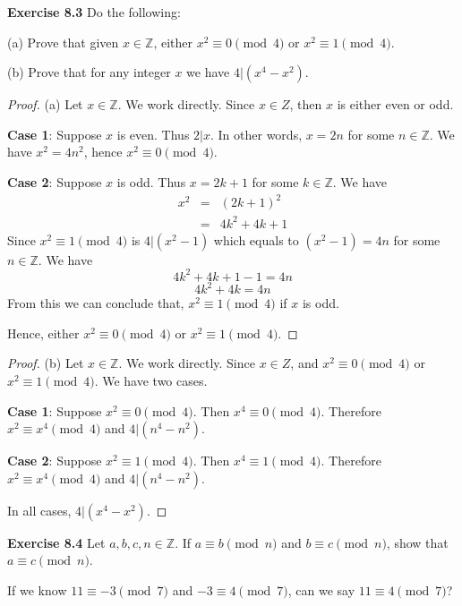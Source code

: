 \documentclass[12pt,oneside]{article}
\newenvironment{exercise}[1]{\vspace{.1in}\noindent\textbf{Exercise #1 \hspace{.05em}}}{}
\newcommand{\Z}{\mathbb{Z}}
\renewcommand{\mod}[3]{#1 \equiv #2 \pmod{#3}}
\begin{document}
\newpage


\begin{exercise}{8.3}
Do the following:

(a) Prove that given $x \in \Z$, either $\mod{x^2}{0}{4}$ or $\mod{x^2}{1}{4}$.

(b) Prove that for any integer $x$ we have $4|(x^4-x^2)$.
\end{exercise}

\begin{proof} {(a)}
Let $x \in \Z$. We work directly. Since $x \in Z$, then $x$ is either even or odd.

\textbf{Case 1}: Suppose $x$ is even. Thus $2|x$. In other words, $x = 2n$ for some $n \in \Z$. We have $x^2 = 4n^2$, hence $\mod{x^2}{0}{4}$.

\textbf{Case 2}: Suppose $x$ is odd. Thus $x = 2k + 1$ for some $k \in \Z$. We have
\begin{eqnarray*}
x^2 &=& (2k + 1)^2\\
&=& 4k^2 + 4k + 1
\end{eqnarray*}
Since $\mod{x^2}{1}{4}$ is $4|(x^2 - 1)$ which equals to $(x^2 - 1) = 4n$ for some $n \in \Z$. We have
\[4k^2 + 4k + 1 - 1 = 4n\]
\[4k^2 + 4k = 4n\]
From this we can conclude that, $\mod{x^2}{1}{4}$ if $x$ is odd.

Hence, either $\mod{x^2}{0}{4}$ or $\mod{x^2}{1}{4}$.
\end{proof}


\begin{proof} {(b)}
Let $x \in \Z$. We work directly. Since $x \in Z$, and $\mod{x^2}{0}{4}$ or $\mod{x^2}{1}{4}$. We have two cases.

\textbf{Case 1}: Suppose $\mod{x^2}{0}{4}$. Then $\mod{x^4}{0}{4}$. Therefore $\mod{x^2}{x^4}{4}$ and $4|(n^4 - n^2)$.

\textbf{Case 2}: Suppose $\mod{x^2}{1}{4}$. Then $\mod{x^4}{1}{4}$. Therefore $\mod{x^2}{x^4}{4}$ and $4|(n^4 - n^2)$.

In all cases, $4|(x^4-x^2)$.
\end{proof}



\begin{exercise}{8.4}
Let $a,b,c,n \in \Z$. If $\mod{a}{b}{n}$ and $\mod{b}{c}{n}$, show that \\ $\mod{a}{c}{n}$.

If we know $\mod{11}{-3}{7}$ and $\mod{-3}{4}{7}$, can we say $\mod{11}{4}{7}$?
\end{exercise}
\end{document}
